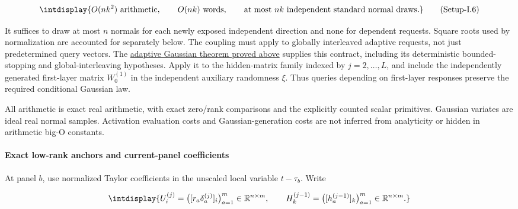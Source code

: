 \label{int:eq-setup-i-6}
\begingroup\renewcommand{\theHequation}{intdisplay.1087}
\begin{equation}
\intdisplay{
O(nk^2)\ \text{arithmetic},\qquad O(nk)\ \text{words},\qquad
\text{at most }nk\ \text{independent standard normal draws}.
}
\tag{Setup-I.6}
\label{int:eq-0574-setup-i-6}
\end{equation}
\endgroup


It suffices to draw at most \(n\) normals for each newly exposed independent direction and none for dependent requests. Square roots used by normalization are accounted for separately below. The coupling must apply to globally interleaved adaptive requests, not just predetermined query vectors. The \hyperref[int:setup-sampler]{adaptive Gaussian theorem proved above} supplies this contract, including its deterministic bounded-stopping and global-interleaving hypotheses. Apply it to the hidden-matrix family indexed by \(j=2,\ldots,L\), and include the independently generated first-layer matrix \(W_0^{(1)}\) in the independent auxiliary randomness \(\xi\). Thus queries depending on first-layer responses preserve the required conditional Gaussian law.



All arithmetic is exact real arithmetic, with exact zero/rank comparisons and the explicitly counted scalar primitives. Gaussian variates are ideal real normal samples. Activation evaluation costs and Gaussian-generation costs are not inferred from analyticity or hidden in arithmetic big-O constants.


\paragraph{Exact low-rank anchors and current-panel coefficients}
\label{int:setup-implicit-2}
\mbox{}\par\smallskip


At panel \(b\), use normalized Taylor coefficients in the unscaled local variable \(t-\tau_b\). Write


\begingroup\renewcommand{\theHequation}{intdisplay.1088}
\begin{equation*}
\intdisplay{
U_i^{(j)}=
\bigl([r_a\delta_a^{(j)}]_i\bigr)_{a=1}^m\in\mathbb R^{n\times m},
\qquad
H_k^{(j-1)}=
\bigl([h_a^{(j-1)}]_k\bigr)_{a=1}^m\in\mathbb R^{n\times m}.
}
\end{equation*}
\endgroup

